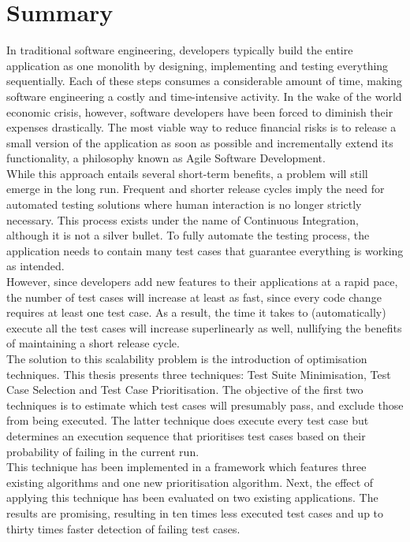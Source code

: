 
\chapter*{Summary}
In traditional software engineering, developers typically build the entire application as one monolith by designing, implementing and testing everything sequentially. Each of these steps consumes a considerable amount of time, making software engineering a costly and time-intensive activity. In the wake of the world economic crisis, however, software developers have been forced to diminish their expenses drastically. The most viable way to reduce financial risks is to release a small version of the application as soon as possible and incrementally extend its functionality, a philosophy known as Agile Software Development.\\

\noindent While this approach entails several short-term benefits, a problem will still emerge in the long run. Frequent and shorter release cycles imply the need for automated testing solutions where human interaction is no longer strictly necessary. This process exists under the name of Continuous Integration, although it is not a silver bullet. To fully automate the testing process, the application needs to contain many test cases that guarantee everything is working as intended. \\

\noindent However, since developers add new features to their applications at a rapid pace, the number of test cases will increase at least as fast, since every code change requires at least one test case. As a result, the time it takes to (automatically) execute all the test cases will increase superlinearly as well, nullifying the benefits of maintaining a short release cycle.\\

\noindent The solution to this scalability problem is the introduction of optimisation techniques. This thesis presents three techniques: Test Suite Minimisation, Test Case Selection and Test Case Prioritisation. The objective of the first two techniques is to estimate which test cases will presumably pass, and exclude those from being executed. The latter technique does execute every test case but determines an execution sequence that prioritises test cases based on their probability of failing in the current run.\\

\noindent This technique has been implemented in a framework which features three existing algorithms and one new prioritisation algorithm. Next, the effect of applying this technique has been evaluated on two existing applications. The results are promising, resulting in ten times less executed test cases and up to thirty times faster detection of failing test cases.\\